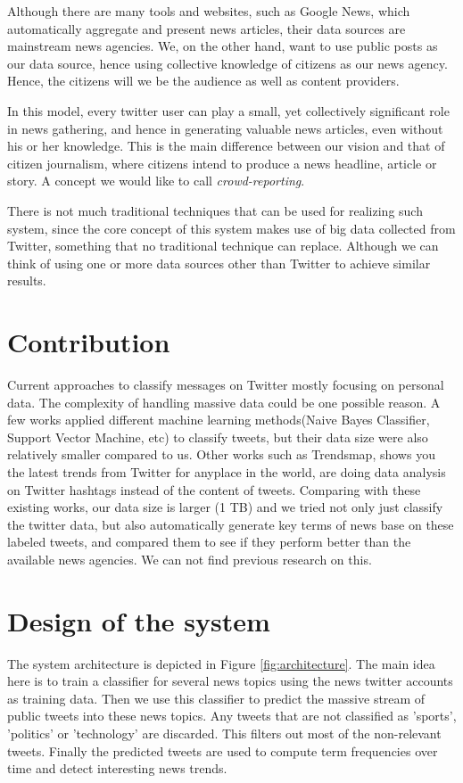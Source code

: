 \documentclass{llncs}
\begin{document}
Although there are many tools and websites, such as Google News, which automatically aggregate and present news articles, their data sources are  mainstream news agencies. We, on the other hand, want to use public posts as our data source, hence using collective knowledge of citizens as our news agency. Hence, the citizens will we be the audience as well as content providers.

In this model, every twitter user can play a small, yet collectively significant role in news gathering, and hence in generating valuable news articles, even without his or her knowledge. This is the main difference between our vision and that of citizen journalism, where citizens intend to produce a news headline, article or story. A concept we would like to call \textit{crowd-reporting}.

There is not much traditional techniques that can be used for realizing such system, since the core concept of this system makes use of big data collected from Twitter, something that no traditional technique can replace. Although we can think of using one or more data sources other than Twitter to achieve similar results.

\section{Contribution}
Current approaches to classify messages on Twitter mostly focusing on personal data. The complexity of handling massive data could be one possible reason. A few works\cite{Go_Bhayani_Huang_2009}\cite{twitter-classifier} applied different machine learning methods(Naive Bayes Classifier, Support Vector Machine, etc) to classify tweets, but their data size were also relatively smaller compared to us. Other works such as Trendsmap\cite{Trendmap}, shows you the latest trends from Twitter for anyplace in the world, are doing data analysis on Twitter hashtags instead of the content of tweets. Comparing with these existing works, our data size is larger (1 TB) and we tried not only just classify the twitter data, but also automatically generate key terms of news base on these labeled tweets, and compared them to see if they perform better than the available news agencies. We can not find previous research on this.

\section{Design of the system}
The system architecture is depicted in Figure \ref{fig:architecture}. The main idea here is to train a classifier for several news topics using the news twitter accounts as training data. Then we use this classifier to predict the massive stream of public tweets into these news topics. Any tweets that are not classified as 'sports', 'politics' or 'technology' are discarded. This filters out most of the non-relevant tweets. Finally the predicted tweets are used to compute term frequencies over time and detect interesting news trends.
\end{document}

